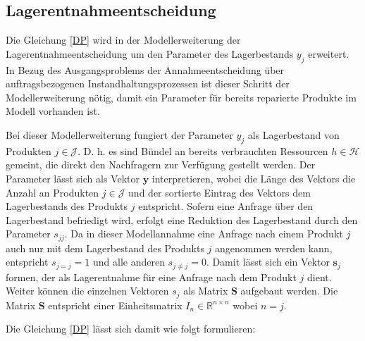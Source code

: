 \subsection{Lagerentnahmeentscheidung}

Die Gleichung \eqref{DP} wird in der Modellerweiterung der Lagerentnahmeentscheidung um den Parameter des Lagerbestands $y_{j}$ erweitert. In Bezug des Ausgangsproblems der Annahmeentscheidung über auftragsbezogenen Instandhaltungsprozessen ist dieser Schritt der Modellerweiterung nötig, damit ein Parameter für bereits reparierte Produkte im Modell vorhanden ist. 

Bei dieser Modellerweiterung fungiert der Parameter $y_{j}$ als Lagerbestand von Produkten $j\in\mathcal{J}$. D. h. es sind Bündel an bereits verbrauchten Ressourcen $h\in\mathcal{H}$ gemeint, die direkt den Nachfragern zur Verfügung gestellt werden. Der Parameter lässt sich als Vektor $\textbf{y}$ interpretieren, wobei die Länge des Vektors die Anzahl an Produkten $j\in\mathcal{J}$ und der sortierte Eintrag des Vektors dem Lagerbestands des Produkts $j$ entspricht. Sofern eine Anfrage über den Lagerbestand befriedigt wird, erfolgt eine Reduktion des Lagerbestand durch den Parameter $s_{jj}$. Da in dieser Modellannahme eine Anfrage nach einem Produkt $j$ auch nur mit dem Lagerbestand des Produkts $j$ angenommen werden kann, entspricht $s_{j=j}=1$ und alle anderen $s_{j\neq j}=0$. Damit lässt sich ein Vektor $\textbf{s}_j$ formen, der als Lagerentnahme für eine Anfrage nach dem Produkt $j$ dient. Weiter können die einzelnen Vektoren $s_{j}$ als Matrix $\textbf{S}$ aufgebaut werden. Die Matrix $\textbf{S}$ entspricht einer Einheitsmatrix $I_{n}\in\mathbb{R}^{n\times n}$ wobei $n=j$.

Die Gleichung \eqref{DP} lässt sich damit wie folgt formulieren:

